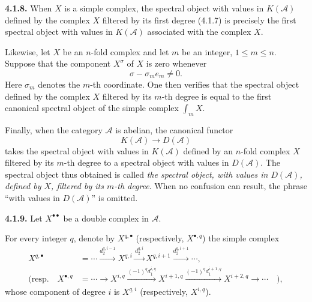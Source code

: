 \clearpage
{}%
\begingroup\small\setlength{\parskip}{0pt}\setlength{\emergencystretch}{1.5em}
\setlength{\abovedisplayskip}{4pt plus 2pt minus 2pt}%
\setlength{\belowdisplayskip}{4pt plus 2pt minus 2pt}%

\noindent\textbf{4.1.8.}\quad
When $X$ is a simple complex, the spectral object with values in
$K(\mathcal A)$ defined by the complex $X$ filtered by its first degree
(4.1.7) is precisely the first spectral object with values in
$K(\mathcal A)$ associated with the complex $X$.

Likewise, let $X$ be an $n$-fold complex and let $m$ be an integer,
$1\leq m\leq n$. Suppose that the component $X^\sigma$ of $X$ is zero
whenever
\[
\sigma-\sigma_m e_m\neq0.
\]
Here $\sigma_m$ denotes the $m$-th coordinate.
One then verifies that the spectral object defined by the complex $X$
filtered by its $m$-th degree is equal to the first canonical spectral
object of the simple complex $\int_m X$.

Finally, when the category $\mathcal A$ is abelian, the canonical functor
\[
K(\mathcal A)\longrightarrow D(\mathcal A)
\]
takes the spectral object with values in $K(\mathcal A)$ defined by an
$n$-fold complex $X$ filtered by its $m$-th degree to a spectral object
with values in $D(\mathcal A)$. The spectral object thus obtained is called
\emph{the spectral object, with values in $D(\mathcal A)$, defined by $X$,
filtered by its $m$-th degree}. When no confusion can result, the phrase
``with values in $D(\mathcal A)$'' is omitted.

\medskip\noindent\textbf{4.1.9.}\quad
Let $X^{\bullet\bullet}$ be a double complex in $\mathcal A$.

For every integer $q$, denote by $X^{q,\bullet}$ (respectively,
$X^{\bullet,q}$) the simple complex
\[
\begin{aligned}
X^{q,\bullet}
&=\cdots\xrightarrow{d_2^{q,i-1}}X^{q,i}
  \xrightarrow{d_2^{q,i}}X^{q,i+1}
  \xrightarrow{d_2^{q,i+1}}\cdots,\\[3pt]
(\text{resp.}\quad X^{\bullet,q}
&=\cdots\longrightarrow X^{i,q}
  \xrightarrow{(-1)^q d_1^{i,q}}X^{i+1,q}
  \xrightarrow{(-1)^q d_1^{i+1,q}}X^{i+2,q}
  \longrightarrow\cdots\quad),
\end{aligned}
\]
whose component of degree $i$ is $X^{q,i}$ (respectively, $X^{i,q}$).

